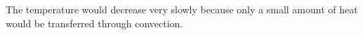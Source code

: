 The temperature would decrease very slowly because only a small amount of heat would be transferred through convection.